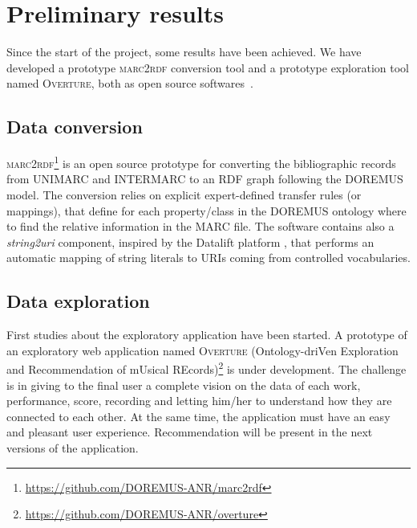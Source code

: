 \documentclass{llncs}
\begin{document}


\section{Preliminary results}
\label{sec:results}
Since the start of the project, some results have been achieved. We have developed a prototype \textsc{marc2rdf} conversion tool and a prototype exploration tool named \textsc{Overture}, both as open source softwares~\cite{lisena2016exploring}. 

\subsection{Data conversion}
\textsc{marc2rdf}\footnote{\url{https://github.com/DOREMUS-ANR/marc2rdf}} is an open source prototype for converting the bibliographic records from UNIMARC and INTERMARC to an RDF graph following the DOREMUS model. The conversion relies on explicit expert-defined transfer rules (or mappings), that define for each property/class in the DOREMUS ontology where to find the relative information in the MARC file. The software contains also a \textit{string2uri} component, inspired by the Datalift platform \cite{scharffe2012enabling}, that performs an automatic mapping of string literals to URIs coming from controlled vocabularies.

\subsection{Data exploration}
First studies about the exploratory application have been started. A prototype of an exploratory web application named \textsc{Overture} (Ontology-driVen Exploration and Recommendation of mUsical REcords)\footnote{\url{https://github.com/DOREMUS-ANR/overture}} is under development. The challenge is in giving to the final user a complete vision on the data of each work, performance, score, recording and letting him/her to understand how they are connected to each other. At the same time, the application must have an easy and pleasant user experience. 
Recommendation will be present in the next versions of the application.
\end{document}
